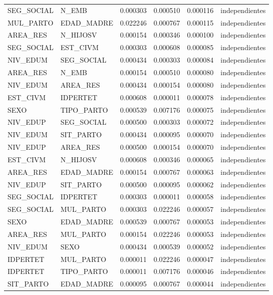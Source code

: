 \begin{tabular}{llrrrl}
SEG\_SOCIAL & N\_EMB & 0.000303 & 0.000510 & 0.000116 & independientes \\
MUL\_PARTO & EDAD\_MADRE & 0.022246 & 0.000767 & 0.000115 & independientes \\
AREA\_RES & N\_HIJOSV & 0.000154 & 0.000346 & 0.000100 & independientes \\
SEG\_SOCIAL & EST\_CIVM & 0.000303 & 0.000608 & 0.000085 & independientes \\
NIV\_EDUM & SEG\_SOCIAL & 0.000434 & 0.000303 & 0.000084 & independientes \\
AREA\_RES & N\_EMB & 0.000154 & 0.000510 & 0.000080 & independientes \\
NIV\_EDUM & AREA\_RES & 0.000434 & 0.000154 & 0.000080 & independientes \\
EST\_CIVM & IDPERTET & 0.000608 & 0.000011 & 0.000078 & independientes \\
SEXO & TIPO\_PARTO & 0.000539 & 0.007176 & 0.000075 & independientes \\
NIV\_EDUP & SEG\_SOCIAL & 0.000500 & 0.000303 & 0.000072 & independientes \\
NIV\_EDUM & SIT\_PARTO & 0.000434 & 0.000095 & 0.000070 & independientes \\
NIV\_EDUP & AREA\_RES & 0.000500 & 0.000154 & 0.000070 & independientes \\
EST\_CIVM & N\_HIJOSV & 0.000608 & 0.000346 & 0.000065 & independientes \\
AREA\_RES & EDAD\_MADRE & 0.000154 & 0.000767 & 0.000063 & independientes \\
NIV\_EDUP & SIT\_PARTO & 0.000500 & 0.000095 & 0.000062 & independientes \\
SEG\_SOCIAL & IDPERTET & 0.000303 & 0.000011 & 0.000058 & independientes \\
SEG\_SOCIAL & MUL\_PARTO & 0.000303 & 0.022246 & 0.000057 & independientes \\
SEXO & EDAD\_MADRE & 0.000539 & 0.000767 & 0.000053 & independientes \\
AREA\_RES & MUL\_PARTO & 0.000154 & 0.022246 & 0.000053 & independientes \\
NIV\_EDUM & SEXO & 0.000434 & 0.000539 & 0.000052 & independientes \\
IDPERTET & MUL\_PARTO & 0.000011 & 0.022246 & 0.000047 & independientes \\
IDPERTET & TIPO\_PARTO & 0.000011 & 0.007176 & 0.000046 & independientes \\
SIT\_PARTO & EDAD\_MADRE & 0.000095 & 0.000767 & 0.000044 & independientes \\

\end{tabular}
